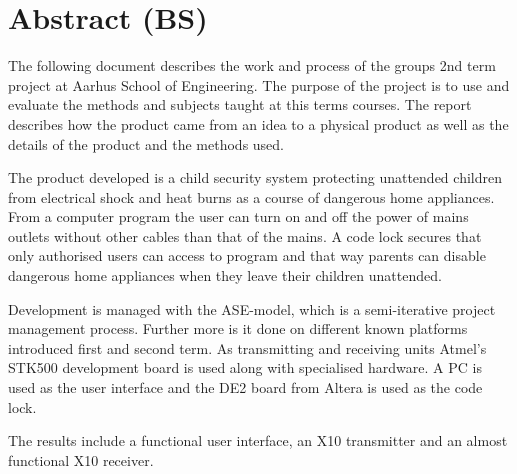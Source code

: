 \chapter*{Abstract (BS)}
The following document describes the work and process of the groups 2nd term project at Aarhus School of Engineering. The purpose of the project is to use and evaluate the methods and subjects taught at this terms courses. The report describes how the product came from an idea to a physical product as well as the details of the product and the methods used.

The product developed is a child security system protecting unattended children from electrical shock and heat burns as a course of dangerous home appliances. From a computer program the user can turn on and off the power of mains outlets without other cables than that of the mains. A code lock secures that only authorised users can access to program and that way parents can disable dangerous home appliances when they leave their children unattended.

Development is managed with the ASE-model, which is a semi-iterative project management process. Further more is it done on different known platforms introduced first and second term. As transmitting and receiving units Atmel’s STK500 development board is used along with specialised hardware. A PC is used as the user interface and the DE2 board from Altera is used as the code lock.

The results include a functional user interface, an X10 transmitter and an almost functional X10 receiver.